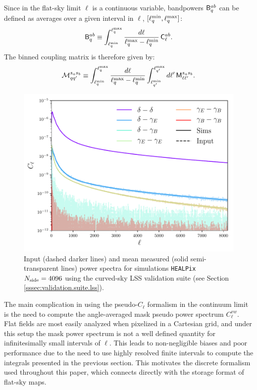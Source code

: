 \documentclass[usenatbib]{mnrasb}
\begin{document}
    Since in the flat-sky limit $\ell$ is a continuous variable, bandpowers ${\sf B}^{ab}_q$ can be defined as averages over a given interval in $\ell$, $[\ell_q^{\rm min},\ell_q^{\rm max}]$:
    \begin{equation}
      {\sf B}^{ab}_q\equiv \int_{\ell_q^{\rm min}}^{\ell_q^{\rm max}} \frac{d\ell}{\ell_q^{\rm max}-\ell_q^{\rm min}}\,{\sf C}^{ab}_\ell.
    \end{equation}
    The binned coupling matrix is therefore given by:
    \begin{equation}
      \mathcal{M}^{s_as_b}_{qq'}\equiv\int^{\ell_q^{\rm max}}_{\ell_q^{\rm min}} \frac{d\ell}{\ell_q^{\rm max}-\ell_q^{\rm min}}\int^{\ell_{q'}^{\rm max}}_{\ell_{q'}^{\rm min}} d\ell'\,{\sf M}^{s_as_b}_{\ell\ell'}.
    \end{equation}
    \begin{figure}
      \centering
      \includegraphics[width=0.99\columnwidth]{val_cl_lss_sph_4096}
      \caption{Input (dashed darker lines) and mean measured (solid semi-transparent lines) power spectra for simulations \texttt{HEALPix} $N_{\rm side}=4096$ using the curved-sky LSS validation suite (see Section \ref{sssec:validation.suite.lss}).}
      \label{fig:validation.fullsky.lss.4096}
    \end{figure}

    The main complication in using the pseudo-$C_\ell$ formalism in the continuum limit is the need to compute the angle-averaged mask pseudo power spectrum $C^{vw}_\ell$. Flat fields are most easily analyzed when pixelized in a Cartesian grid, and under this setup the mask power spectrum is not a well defined quantity for infinitesimally small intervals of $\ell$. This leads to non-negligible biases and poor performance \cite{2016arXiv161204664A} due to the need to use highly resolved finite intervals to compute the integrals presented in the previous section. This motivates the discrete formalism used throughout this paper, which connects directly with the storage format of flat-sky maps.
\end{document}
